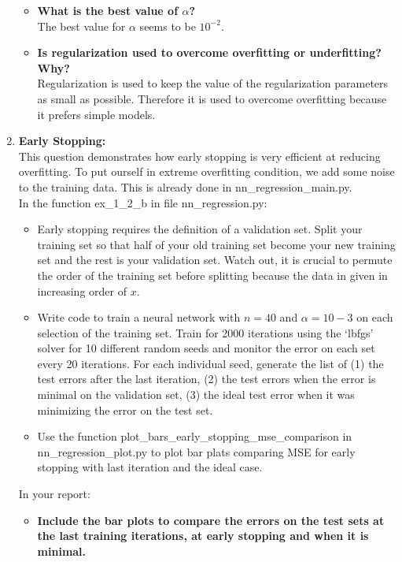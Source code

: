 \documentclass[a4paper]{article}
\begin{document}
\begin{enumerate}[label=(\alph*)]
\begin{itemize}
\item \textbf{What is the best value of $\alpha$?} \\
The best value for $\alpha$ seems to be $10^{-2}$. \\

\item \textbf{Is regularization used to overcome overfitting or underfitting? Why?} \\
Regularization is used to keep the value of the regularization parameters as small as possible. Therefore it is used to overcome overfitting because it prefers simple models.
\end{itemize}

\newpage

    \item \textbf{Early Stopping:}\\
    This question demonstrates how early stopping is very efficient at reducing overfitting. To put ourself in extreme overfitting condition, we add some noise to the training data. This is already done in nn\_regression\_main.py.\\
	In the function ex\_1\_2\_b in file nn\_regression.py:
    \begin{itemize}
        \item Early stopping requires the definition of a validation set. Split your training set so that half of your old training set become your new training set and the rest is your validation set. Watch out, it is crucial to permute the order of the training set before splitting because the data in given in increasing order of $x$.
        \item Write code to train a neural network with $n = 40$ and $\alpha = 10−3$ on each selection of the training set. Train for 2000 iterations using the ‘lbfgs’ solver for 10 different random seeds and monitor the error on each set every 20  iterations. For each individual seed, generate the list of (1) the test errors after the last iteration, (2) the test errors when the error is minimal on the validation set, (3) the ideal test error when it was minimizing the error on the test set.
        \item Use the function plot\_bars\_early\_stopping\_mse\_comparison in nn\_regression\_plot.py to plot bar plats comparing MSE for early stopping with last iteration and the ideal case.
    \end{itemize}
In your report: 
\begin{itemize}
\item \textbf{Include the bar plots to compare the errors on the test sets at the last training iterations, at early stopping and when it is minimal.}


\end{itemize}
\end{enumerate}
\end{document}
